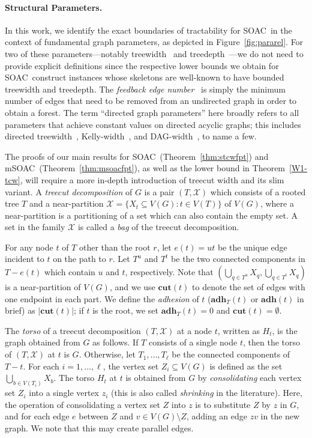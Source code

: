 \documentclass[letterpaper]{article} %
\newcommand{\problem}{{\sc SOAC}\xspace} %
\newcommand{\mproblem}{{\sc mSOAC}\xspace} %
\newcommand{\cut}{{\mathbf{cut}}}
\newcommand{\adh}{{\mathbf{adh}}}
\begin{document}
\paragraph{Structural Parameters.}
In this work, we identify the exact boundaries of tractability for \problem\ in the context of fundamental graph parameters, as depicted in Figure~\ref{fig:pararel}.
For two of these parameters---notably treewidth~\cite{RobertsonS86} and treedepth~\cite{sparsity}---we do not need to provide explicit definitions since the respective lower bounds we obtain for \problem\ construct instances whose skeletons are well-known to have bounded treewidth and treedepth. The \emph{feedback edge number}~\cite{KoanaKNNZ21,FuchsleMNR22} is simply the minimum number of edges that need to be removed from an undirected graph in order to obtain a forest.
The term ``directed graph parameters'' here broadly refers to all parameters that achieve constant values on directed acyclic graphs; this includes directed treewidth~\cite{JohnsonRST01}, Kelly-width~\cite{hunter2008digraph}, and DAG-width~\cite{BerwangerDHKO12}, to name a few. 

The proofs of our main results for \problem\ (Theorem~\ref{thm:stcwfpt}) and \mproblem\ (Theorem~\ref{thm:msoacfpt}), as well as the lower bound in Theorem~\ref{W1-tcw}, will require a more in-depth introduction of treecut width and its slim variant.
A {\em treecut decomposition} of $G$ is a pair $(T,\mathcal{X})$ which consists of a rooted tree $T$ and a near-partition $\mathcal{X}=\{X_t\subseteq V(G): t\in V(T)\}$ of $V(G)$, where a near-partition is a partitioning of a set which can also contain the empty set. A set in the family $\mathcal{X}$ is called a {\em bag} of the treecut decomposition.


For any node $t$ of $T$ other than the root $r$, let $e(t)=ut$ be the unique edge incident to $t$ on the path to $r$. Let $T^u$ and $T^t$ be the two connected components in $T-e(t)$ which contain $u$ and $t$, respectively. Note that $(\bigcup_{q\in T^u} X_q, \bigcup_{q\in T^t} X_q)$ is a near-partition of $V(G)$, and we use $\cut(t)$ to denote the set of edges with one endpoint in each part. We define the {\em adhesion} of $t$ ($\adh_T(t)$ or $\adh(t)$ in brief) as $|\cut(t)|$; if $t$ is the root, we set $\adh_T(t)=0$ and $\cut(t)=\emptyset$.

The {\em torso} of a treecut decomposition $(T,\mathcal{X})$ at a node $t$, written as $H_t$, is the graph obtained from $G$ as follows. If $T$ consists of a single node $t$, then the torso of $(T,\mathcal{X})$ at $t$ is $G$. Otherwise, let $T_1, \ldots , T_{\ell}$ be the connected components of $T-t$. For each $i=1,\ldots , \ell$, the vertex set $Z_i\subseteq V(G)$ is defined as the set $\bigcup_{b\in V(T_i)}X_b$. The torso $H_t$ at $t$ is obtained from $G$ by {\em consolidating} each vertex set $Z_i$ into a single vertex $z_i$ (this is also called \emph{shrinking} in the literature). Here, the operation of consolidating a vertex set $Z$ into $z$ is to substitute $Z$ by $z$ in $G$, and for each edge $e$ between $Z$ and $v\in V(G)\setminus Z$, adding an edge $zv$ in the new graph. We note that this may create parallel edges.
\end{document}

